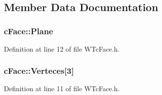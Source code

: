 \subsection{Member Data Documentation}
\hypertarget{classc_face_aa61d6dca6df8211a1a816edbf303bd27}{
\subsubsection[{Plane}]{ {\bf cFace::Plane}}}
\label{classc_face_aa61d6dca6df8211a1a816edbf303bd27}


Definition at line 12 of file WTcFace.h.

\hypertarget{classc_face_ae08ccc2952b022dce6848628649d61c8}{
\subsubsection[{Verteces}]{ {\bf cFace::Verteces}\mbox{[}3\mbox{]}}}
\label{classc_face_ae08ccc2952b022dce6848628649d61c8}


Definition at line 11 of file WTcFace.h.

